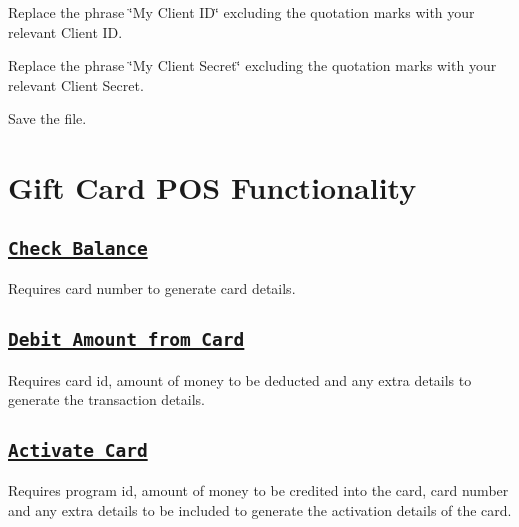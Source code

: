 \begin{DoxyEnumerate}
\item Replace the phrase \char`\"{}\+My Client I\+D\char`\"{} excluding the quotation marks with your relevant Client ID.
\item Replace the phrase \char`\"{}\+My Client Secret\char`\"{} excluding the quotation marks with your relevant Client Secret.
\item Save the file.
\end{DoxyEnumerate}

\section*{Gift Card P\+OS Functionality}

\subsection*{\href{class_giift_a_p_i_c_sharp_1_1_giift_a_p_i_client.html#a3cc1b6eadcdf5fea49f33b591b101782}{\tt Check Balance}}

Requires card number to generate card details.

\subsection*{\href{class_giift_a_p_i_c_sharp_1_1_giift_a_p_i_client.html#a8324e05441c2f9fbeedfb4ca4a5589ab}{\tt Debit Amount from Card}}

Requires card id, amount of money to be deducted and any extra details to generate the transaction details.

\subsection*{\href{class_giift_a_p_i_c_sharp_1_1_giift_a_p_i_client.htmla09e5a5e4af058ddc6ee72ebf8073af50}{\tt Activate Card}}

Requires program id, amount of money to be credited into the card, card number and any extra details to be included to generate the activation details of the card. 